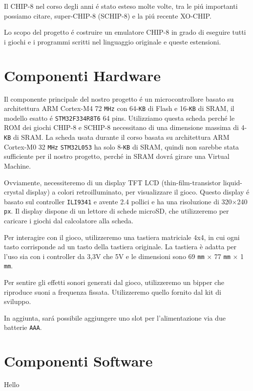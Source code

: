\documentclass[a4paper]{article}
\begin{document}
Il CHIP-8 nel corso degli anni é stato esteso molte volte, tra le piú importanti possiamo citare, super-CHIP-8 (SCHIP-8) e la piú recente XO-CHIP.  

Lo scopo del progetto é costruire un emulatore CHIP-8 in grado di eseguire tutti i giochi e i programmi scritti nel linguaggio originale e queste estensioni. 


\section{Componenti Hardware}

Il componente principale del nostro progetto é un microcontrollore basato su architettura ARM Cortex-M4 72 \texttt{MHz} con 64-\texttt{KB} di Flash e 16-\texttt{KB} di SRAM, il  modello esatto é \texttt{STM32F334R8T6} 64 pins. Utilizziamo questa scheda perché le ROM dei giochi CHIP-8 e SCHIP-8 necessitano di una dimensione massima di 4-\texttt{KB} di SRAM. La scheda usata durante il corso basata su architettura ARM Cortex-M0 32 \texttt{MHz} \texttt{STM32L053} ha solo 8-\texttt{KB} di SRAM, quindi non sarebbe stata sufficiente per il nostro progetto, perché in SRAM dovrá girare una Virtual Machine. 

Ovviamente, necessiteremo di un display TFT LCD (thin-film-transistor liquid-crystal display) a colori retroilluminato, per visualizzare il gioco. Questo display é basato sul controller \texttt{ILI9341} e avente 2.4 pollici e ha una risoluzione di 320$\times$240 \texttt{px}. Il display dispone di un lettore di schede microSD, che utilizzeremo per caricare i giochi dal calcolatore alla scheda.

Per interagire con il gioco, utilizzeremo una tastiera matriciale 4x4, in cui ogni tasto corrisponde ad un tasto della tastiera originale. La tastiera è adatta per l'uso sia con i controller da 3,3V che 5V e le dimensioni sono 69 \texttt{mm} $\times$ 77 \texttt{mm} $\times$ 1 \texttt{mm}.  

Per sentire gli effetti sonori generati dal gioco, utilizzeremo un bipper che riproduce suoni a frequenza fissata. Utilizzeremo quello fornito dal kit di sviluppo.

In aggiunta, sará possibile aggiungere uno slot per l'alimentazione via due batterie \texttt{AAA}.

\section{Componenti Software}

Hello
\end{document}

